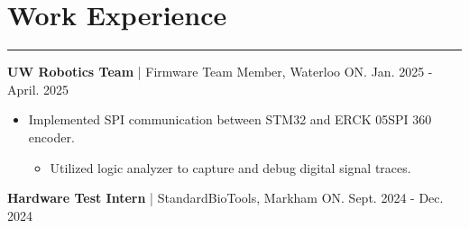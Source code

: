 \documentclass{article}
\begin{document}
\vspace{-0.5cm}     
\section*{\hspace{0.2cm} \large Work Experience}
\begin{center}
    \vspace{-0.5cm}
    \rule{\textwidth}{0.1pt}
\end{center}

\vspace{0cm}
\textbf{\hspace{-0.10cm} UW Robotics Team} | Firmware Team Member, Waterloo ON. \hspace {4.5cm} {\small Jan. 2025 - April. 2025}

\vspace{-0.2cm}
\begin{itemize}[leftmargin=1.5cm]

    \item {Implemented SPI communication between STM32 and ERCK 05SPI 360 encoder.
    \vspace{-0.2cm}
    \begin{itemize} [label=$\circ$, leftmargin=0.5cm]
        \item {Utilized logic analyzer to capture and debug digital signal traces.}
    \end{itemize}
    
    }    
\end{itemize}



\vspace{0cm}
\textbf{\hspace{-0.10cm} Hardware Test Intern} | StandardBioTools, Markham ON. \hspace {5.2cm} {\small Sept. 2024 - Dec. 2024}
\end{document}
